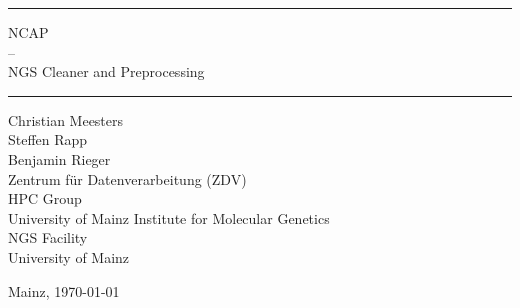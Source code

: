\thispagestyle{empty}
\newcommand{\Rule}{\rule{\textwidth}{1mm}}
\begin{center}
\Rule\vspace{5mm}
\sffamily\bfseries\LARGE

NCAP \\
-- \\
NGS Cleaner and Preprocessing
\vspace{1mm}\Rule
\vfill
Christian Meesters\\
Steffen Rapp\\
Benjamin Rieger\\

\vfill
Zentrum für Datenverarbeitung (ZDV)\\
HPC Group\\
University of Mainz
\vfill
Institute for Molecular Genetics\\
NGS Facility\\
University of Mainz

\vspace{2cm}

\hfill
\vfill
\small Mainz, \today
\end{center}
